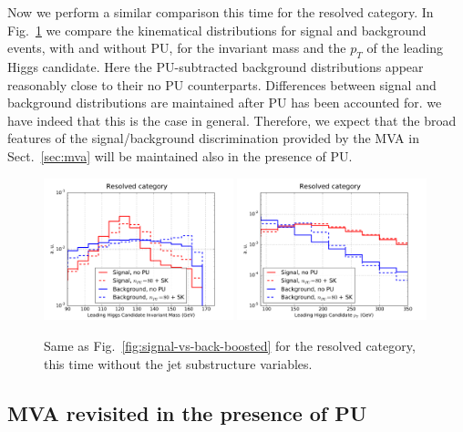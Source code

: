 Now we perform a similar comparison this time for
the resolved category.
%
In Fig.~\ref{fig:signal-vs-back-resolved} we compare
the kinematical distributions for signal and background events,
     with and without PU, for the invariant mass and the $p_T$ of the leading
     Higgs candidate.
     Here the PU-subtracted background distributions appear reasonably close
     to their no PU counterparts.
     Differences between signal and background distributions are maintained after PU
     has been accounted for.
     we have indeed that this is the case
     in general.
     Therefore, we expect that the broad features of the signal/background
     discrimination provided by the MVA in Sect.~\ref{sec:mva} will
     be maintained also in the presence of PU.


\begin{figure}[t]
  \begin{center}
   \includegraphics[width=0.49\textwidth]{plots/m_h0_res_comp_back.pdf}
  \includegraphics[width=0.49\textwidth]{plots/pt_h0_res_comp_back.pdf}
     \caption{\small
       Same as Fig.~\ref{fig:signal-vs-back-boosted} for the resolved category,
       this time without the jet substructure variables.
}
\label{fig:signal-vs-back-resolved}
\end{center}
\end{figure}





\subsection{MVA revisited in the presence of PU}


